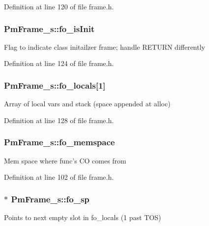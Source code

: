 Definition at line 120 of file frame.\-h.

\hypertarget{struct_pm_frame__s_a3447b81b1d8fbf95cae30d054b81c168}{
\subsubsection[{fo\-\_\-is\-Init}]{ Pm\-Frame\-\_\-s\-::fo\-\_\-is\-Init}}\label{struct_pm_frame__s_a3447b81b1d8fbf95cae30d054b81c168}
Flag to indicate class initailzer frame; handle R\-E\-T\-U\-R\-N differently 

Definition at line 124 of file frame.\-h.

\hypertarget{struct_pm_frame__s_adfe4e983a61e7615ffa0219baf8d6632}{
\subsubsection[{fo\-\_\-locals}]{ Pm\-Frame\-\_\-s\-::fo\-\_\-locals\mbox{[}1\mbox{]}}}\label{struct_pm_frame__s_adfe4e983a61e7615ffa0219baf8d6632}
Array of local vars and stack (space appended at alloc) 

Definition at line 128 of file frame.\-h.

\hypertarget{struct_pm_frame__s_ae2f6eee1acc2c6d1de398ce187e55100}{
\subsubsection[{fo\-\_\-memspace}]{ Pm\-Frame\-\_\-s\-::fo\-\_\-memspace}}\label{struct_pm_frame__s_ae2f6eee1acc2c6d1de398ce187e55100}
Mem space where func's C\-O comes from 

Definition at line 102 of file frame.\-h.

\hypertarget{struct_pm_frame__s_aa256889546729dcf74733e782b03e88b}{
\subsubsection[{fo\-\_\-sp}]{$\ast$ Pm\-Frame\-\_\-s\-::fo\-\_\-sp}}\label{struct_pm_frame__s_aa256889546729dcf74733e782b03e88b}
Points to next empty slot in fo\-\_\-locals (1 past T\-O\-S) 


